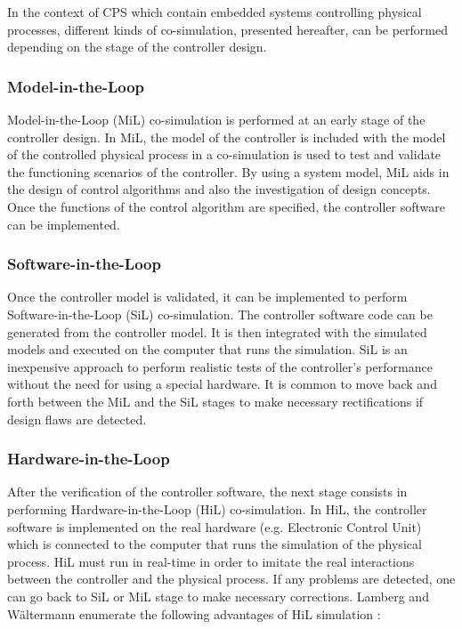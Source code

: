 In the context of CPS which contain embedded systems controlling physical processes, different kinds of co-simulation, presented hereafter, can be performed depending on the stage of the controller design.

\subsubsection{Model-in-the-Loop}

Model-in-the-Loop (MiL) co-simulation is performed at an early stage of the controller design. In MiL, the model of the controller is included with the model of the controlled physical process in a co-simulation is used to test and validate the functioning scenarios of the controller. By using a system model, MiL aids in the design of control algorithms and also the investigation of design concepts. Once the functions of the control algorithm are specified, the controller software can be implemented.

\subsubsection{Software-in-the-Loop}

Once the controller model is validated, it can be implemented to perform Software-in-the-Loop (SiL) co-simulation. The controller software code can be generated from the controller model. It is then integrated with the simulated models and executed on the computer that runs the simulation. SiL is an inexpensive approach to perform realistic tests of the controller’s performance without the need for using a special hardware. It is common to move back and forth between the MiL and the SiL stages to make necessary rectifications if design flaws are detected.

\subsubsection{Hardware-in-the-Loop}

After the verification of the controller software, the next stage consists in performing Hardware-in-the-Loop (HiL) co-simulation. In HiL, the controller software is implemented on the real hardware (e.g. Electronic Control Unit) which is connected to the computer that runs the simulation of the physical process. HiL must run in real-time in order to imitate the real interactions between the controller and the physical process. If any problems are detected, one can go back to SiL or MiL stage to make necessary corrections. Lamberg and W{\"a}ltermann enumerate the following advantages of HiL simulation \cite{lamberg:2000}:

